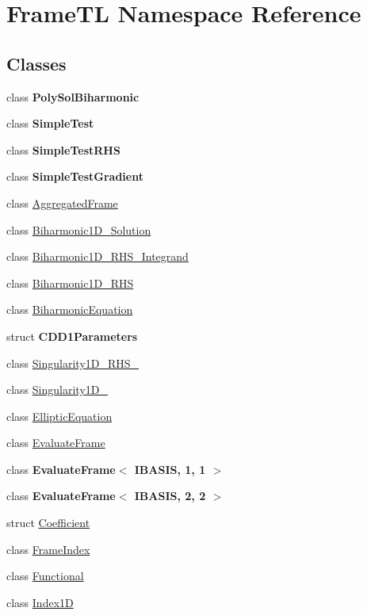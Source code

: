 \hypertarget{namespaceFrameTL}{
\section{FrameTL Namespace Reference}
\label{namespaceFrameTL}
}
\subsection*{Classes}
\begin{CompactItemize}
\item 
class \textbf{PolySolBiharmonic}
\item 
class \textbf{SimpleTest}
\item 
class \textbf{SimpleTestRHS}
\item 
class \textbf{SimpleTestGradient}
\item 
class \hyperlink{classFrameTL_1_1AggregatedFrame}{AggregatedFrame}
\item 
class \hyperlink{classFrameTL_1_1Biharmonic1D__Solution}{Biharmonic1D\_\-Solution}
\item 
class \hyperlink{classFrameTL_1_1Biharmonic1D__RHS__Integrand}{Biharmonic1D\_\-RHS\_\-Integrand}
\item 
class \hyperlink{classFrameTL_1_1Biharmonic1D__RHS}{Biharmonic1D\_\-RHS}
\item 
class \hyperlink{classFrameTL_1_1BiharmonicEquation}{BiharmonicEquation}
\item 
struct \textbf{CDD1Parameters}
\item 
class \hyperlink{classFrameTL_1_1Singularity1D__RHS__2}{Singularity1D\_\-RHS\_}
\item 
class \hyperlink{classFrameTL_1_1Singularity1D__2}{Singularity1D\_}
\item 
class \hyperlink{classFrameTL_1_1EllipticEquation}{EllipticEquation}
\item 
class \hyperlink{classFrameTL_1_1EvaluateFrame}{EvaluateFrame}
\item 
class \textbf{EvaluateFrame$<$ IBASIS, 1, 1 $>$}
\item 
class \textbf{EvaluateFrame$<$ IBASIS, 2, 2 $>$}
\item 
struct \hyperlink{structFrameTL_1_1Coefficient}{Coefficient}
\item 
class \hyperlink{classFrameTL_1_1FrameIndex}{FrameIndex}
\item 
class \hyperlink{classFrameTL_1_1Functional}{Functional}
\item 
class \hyperlink{classFrameTL_1_1Index1D}{Index1D}

\end{CompactItemize}
